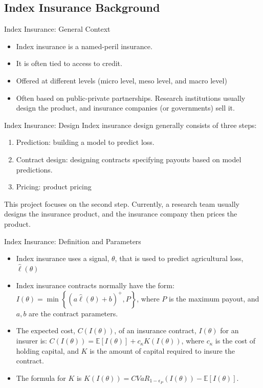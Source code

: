 \documentclass{beamer}
\begin{document}
  
\subsection{Index Insurance Background}
\begin{frame}{Index Insurance: General Context}
\begin{itemize}
    \setlength\itemsep{1em}
    \item Index insurance is a named-peril insurance.
    \item It is often tied to access to credit.
    \item Offered at different levels (micro level, meso level, and macro level)
    \item Often based on public-private partnerships. Research institutions usually design the product, and insurance companies (or governments) sell it. 
\end{itemize}
\end{frame} 

\begin{frame}{Index Insurance: Design}
Index insurance design generally consists of three steps: 
\begin{enumerate}
    \setlength\itemsep{1em}
    \item Prediction: building a model to predict loss. 
    \item Contract design: designing contracts specifying payouts based on model predictions.
    \item Pricing: product pricing
\end{enumerate}
This project focuses on the second step. Currently, a research team usually designs the insurance product, and the insurance company then prices the product.
\end{frame} 

\begin{frame}{Index Insurance: Definition and Parameters}
\begin{itemize}
    \setlength\itemsep{1em}
    \item Index insurance uses a signal, $\theta$, that is used to predict agricultural loss, $\hat{\ell}(\theta)$
    \item Index insurance contracts normally have the form: $I(\theta) = \min \left \{ \left (a\hat{\ell}(\theta) + b \right )^+, P \right \}$, where $P$ is the maximum payout, and $a,b$ are the contract parameters.
    \item The expected cost, $C(I(\theta))$, of an insurance contract, $I(\theta)$ for an insurer is: $C(I(\theta)) = \mathbb{E}[I(\theta)] + c_{\kappa} K(I(\theta))$, where $c_{\kappa}$ is the cost of holding capital, and $K$ is the amount of capital required to insure the contract.
    \item The formula for $K$ is $K(I(\theta)) = CVaR_{1-\epsilon_P}\left ( I(\theta) \right ) - \mathbb{E}[I(\theta)]$.
\end{itemize}
\end{frame}
\end{document}
